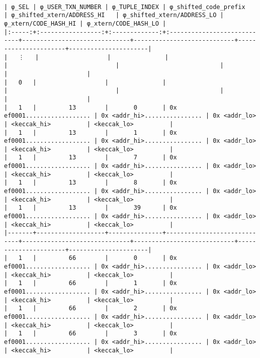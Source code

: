 \documentclass[varwidth=\maxdimen,margin=0.5cm,multi={verbatim}]{standalone}
\begin{document}
\begin{verbatim}

| φ_SEL | φ_USER_TXN_NUMBER | φ_TUPLE_INDEX | φ_shifted_code_prefix       | φ_shifted_xtern/ADDRESS_HI   | φ_shifted_xtern/ADDRESS_LO | φ_xtern/CODE_HASH_HI | φ_xtern/CODE_HASH_LO |
|:-----:+:-----------------:+:-------------:+:----------------------------+------------------------------+----------------------------+----------------------+----------------------|
|   ⋮   |                   |               |                             |                              |                            |                      |                      |
|   0   |                   |               |                             |                              |                            |                      |                      |
|   1   |         13        |       0       | 0x ef0001.................. | 0x <addr_hi>................ | 0x <addr_lo>               | <keccak_hi>          | <keccak_lo>          |
|   1   |         13        |       1       | 0x ef0001.................. | 0x <addr_hi>................ | 0x <addr_lo>               | <keccak_hi>          | <keccak_lo>          |
|   1   |         13        |       7       | 0x ef0001.................. | 0x <addr_hi>................ | 0x <addr_lo>               | <keccak_hi>          | <keccak_lo>          |
|   1   |         13        |       8       | 0x ef0001.................. | 0x <addr_hi>................ | 0x <addr_lo>               | <keccak_hi>          | <keccak_lo>          |
|   1   |         13        |       39      | 0x ef0001.................. | 0x <addr_hi>................ | 0x <addr_lo>               | <keccak_hi>          | <keccak_lo>          |
|-------+-------------------+---------------+-----------------------------+------------------------------+----------------------------+----------------------+----------------------|
|   1   |         66        |       0       | 0x ef0001.................. | 0x <addr_hi>................ | 0x <addr_lo>               | <keccak_hi>          | <keccak_lo>          |
|   1   |         66        |       1       | 0x ef0001.................. | 0x <addr_hi>................ | 0x <addr_lo>               | <keccak_hi>          | <keccak_lo>          |
|   1   |         66        |       2       | 0x ef0001.................. | 0x <addr_hi>................ | 0x <addr_lo>               | <keccak_hi>          | <keccak_lo>          |
|   1   |         66        |       3       | 0x ef0001.................. | 0x <addr_hi>................ | 0x <addr_lo>               | <keccak_hi>          | <keccak_lo>          |

\end{verbatim}
\end{document}
